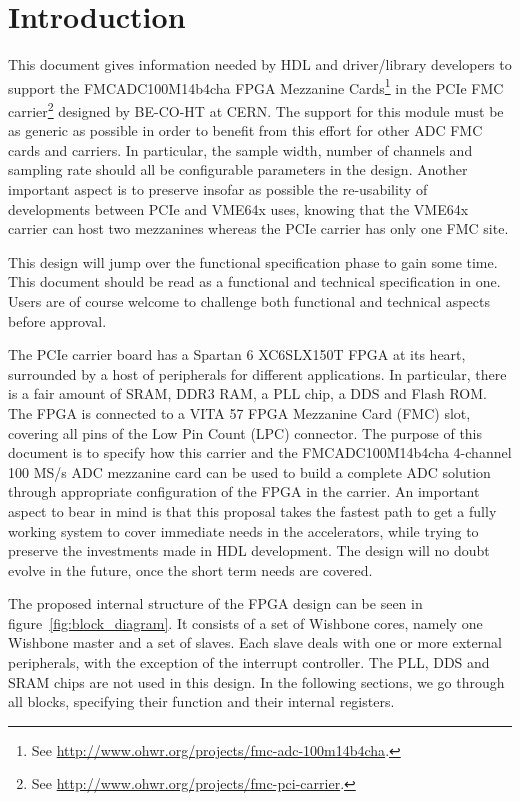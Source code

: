 \documentclass{article}
\begin{document}
\section{Introduction}
This document gives information needed by HDL and driver/library developers to support the FMCADC100M14b4cha FPGA Mezzanine Cards\footnote{See \href{http://www.ohwr.org/projects/fmc-adc-100m14b4cha}{http://www.ohwr.org/projects/fmc-adc-100m14b4cha}.} in the PCIe FMC carrier\footnote{See \href{http://www.ohwr.org/projects/fmc-pci-carrier}{http://www.ohwr.org/projects/fmc-pci-carrier}.} designed by BE-CO-HT at CERN. The support for this module must be as generic as possible in order to benefit from this effort for other ADC FMC cards and carriers. In particular, the sample width, number of channels and sampling rate should all be configurable parameters in the design. Another important aspect is to preserve insofar as possible the re-usability of developments between PCIe and VME64x uses, knowing that the VME64x carrier can host two mezzanines whereas the PCIe carrier has only one FMC site.

This design will jump over the functional specification phase to gain some time. This document should be read as a functional and technical specification in one. Users are of course welcome to challenge both functional and technical aspects before approval.

The PCIe carrier board has a Spartan 6 XC6SLX150T FPGA at its heart, surrounded by a host of peripherals for different applications. In particular, there is a fair amount of SRAM, DDR3 RAM, a PLL chip, a DDS and Flash ROM. The FPGA is connected to a VITA 57 FPGA Mezzanine Card (FMC) slot, covering all pins of the Low Pin Count (LPC) connector. The purpose of this document is to specify how this carrier and the FMCADC100M14b4cha 4-channel 100 MS/s ADC mezzanine card can be used to build a complete ADC solution through appropriate configuration of the FPGA in the carrier. An important aspect to bear in mind is that this proposal takes the fastest path to get a fully working system to cover immediate needs in the accelerators, while trying to preserve the investments made in HDL development. The design will no doubt evolve in the future, once the short term needs are covered.

The proposed internal structure of the FPGA design can be seen in figure~\ref{fig:block_diagram}. It consists of a set of Wishbone cores, namely one Wishbone master and a set of slaves. Each slave deals with one or more external peripherals, with the exception of the interrupt controller. The PLL, DDS and SRAM chips are not used in this design. In the following sections, we go through all blocks, specifying their function and their internal registers.
\end{document}
